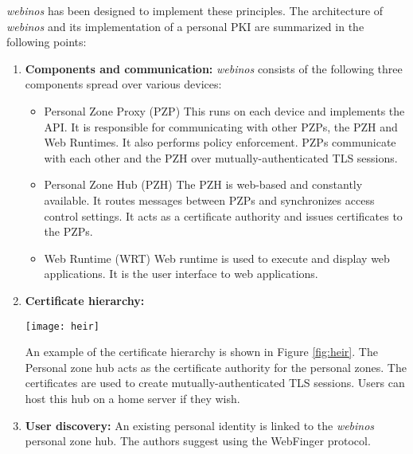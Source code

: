 \textit{webinos} has been designed to implement these principles. The architecture of \textit{webinos} and its implementation of a personal PKI are summarized in the following points:

\begin{enumerate}[label=\arabic*., wide, labelwidth=!, labelindent=0pt]
	\item \textbf{Components and communication:} \textit{webinos} consists of the following three components spread over various devices:
	\begin{itemize}
			\item Personal Zone Proxy (PZP) This runs on each device and implements the API. It is responsible for communicating with other PZPs, 					the PZH and Web Runtimes. It also performs policy enforcement. PZPs communicate with each other and the PZH over mutually-authenticated 				TLS 	sessions.
			\item Personal Zone Hub (PZH) The PZH is web-based and constantly available. It routes messages between PZPs and synchronizes access 				control settings. It acts as a certificate authority and issues certificates to the PZPs.
			\item Web Runtime (WRT) Web runtime is used to execute and display web applications. It is the user interface to web applications.\\
	\end{itemize}
	

	\item \textbf{Certificate hierarchy:}
		\begin{figure*}[!h]
			\centering
			\texttt{[image: heir]}
			\caption{Certificate hierarchy in \textit{webinos} \cite{Lyle2013}}
			\label{fig:heir}
		\end{figure*}
		An example of the certificate hierarchy is shown in Figure \ref{fig:heir}. The Personal zone hub acts as the certificate authority for the 					personal zones. The certificates are used to create mutually-authenticated TLS sessions. Users can host this hub on a home server if they 					wish.\\

	\item \textbf{User discovery:} An existing personal identity is linked to the \textit{webinos} personal zone hub. The authors suggest using the 			WebFinger protocol\cite{Webfinger}.\\
	

\end{enumerate}
